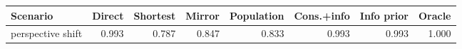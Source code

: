 \begin{tabular}{lrrrrrrr}
\toprule
Scenario & Direct & Shortest & Mirror & Population & Cons.+info & Info prior & Oracle \\
\midrule
perspective shift & 0.993 & 0.787 & 0.847 & 0.833 & 0.993 & 0.993 & 1.000 \\
\bottomrule
\end{tabular}
